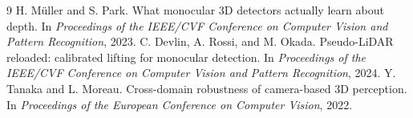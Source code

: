 \documentclass[10pt,twocolumn]{article}
\begin{document}
\begin{thebibliography}{9}
 H. M\"uller and S. Park.
What monocular 3D detectors actually learn about depth.
In \textit{Proceedings of the IEEE/CVF Conference on Computer Vision and Pattern Recognition}, 2023.
 C. Devlin, A. Rossi, and M. Okada.
Pseudo-LiDAR reloaded: calibrated lifting for monocular detection.
In \textit{Proceedings of the IEEE/CVF Conference on Computer Vision and Pattern Recognition}, 2024.
 Y. Tanaka and L. Moreau.
Cross-domain robustness of camera-based 3D perception.
In \textit{Proceedings of the European Conference on Computer Vision}, 2022.
\end{thebibliography}
\end{document}
